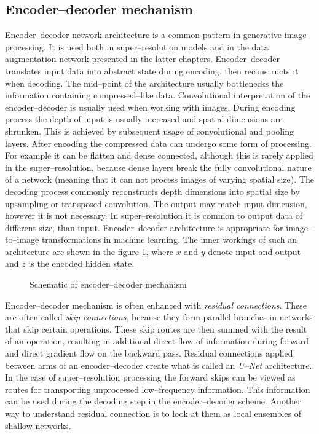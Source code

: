 \subsection{Encoder--decoder mechanism}
Encoder--decoder network architecture is a common pattern in generative image processing.
It is used both in super--resolution models and in the data augmentation network presented in the latter chapters.
Encoder--decoder translates input data into abstract state during encoding, then reconstructs it when decoding.
The mid--point of the architecture usually bottlenecks the information containing compressed--like data.
Convolutional interpretation of the encoder--decoder is usually used when working with images.
During encoding process the depth of input is usually increased and spatial dimensions are shrunken.
This is achieved by subsequent usage of convolutional and pooling layers.
After encoding the compressed data can undergo some form of processing.
For example it can be flatten and dense connected, although this is rarely applied in the super--resolution, because dense layers break the fully convolutional nature of a network (meaning that it can not process images of varying spatial size).
The decoding process commonly reconstructs depth dimensions into spatial size by upsampling or transposed convolution.
The output may match input dimension, however it is not necessary.
In super--resolution it is common to output data of different size, than input.
Encoder--decoder architecture is appropriate for image--to--image transformations in machine learning.
The inner workings of such an architecture are shown in the figure \ref{fig:encoder-decoder}, where $ x $ and $ y $ denote input and output and $ z $ is the encoded hidden state. 
\begin{figure}
    \centering
    
    \caption{Schematic of encoder--decoder mechanism}
    \label{fig:encoder-decoder}
\end{figure}

Encoder--decoder mechanism is often enhanced with \textit{residual connections}.
These are often called \textit{skip connections}, because they form parallel branches in networks that skip certain operations.
These skip routes are then summed with the result of an operation, resulting in additional direct flow of information during forward and direct gradient flow on the backward pass.
Residual connections applied between arms of an encoder--decoder create what is called an \textit{U--Net} architecture.
In the case of super--resolution processing the forward skips can be viewed as routes for transporting unprocessed low--frequency information.
This information can be used during the decoding step in the encoder--decoder scheme.
Another way to understand residual connection is to look at them as local ensembles of shallow networks.

